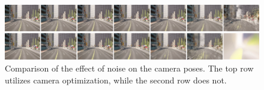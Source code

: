 \begin{figure}[!h]
    \centering
    \includegraphics[width=1.0\textwidth]{figures/noise-short-segments.png}
    \caption{Comparison of the effect of noise on the camera poses. The top row utilizes camera optimization, while the second row does not.}
    \label{fig:noise-short-segments}
\end{figure}